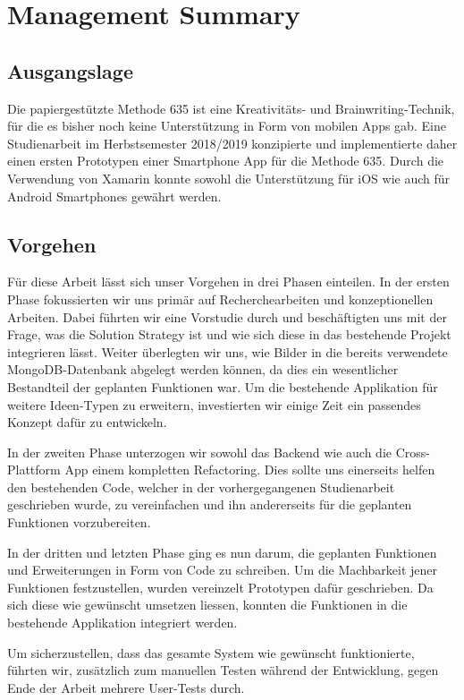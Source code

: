 \section{Management Summary}

\subsection{Ausgangslage}
Die papiergestützte Methode 635 ist eine Kreativitäts- und Brainwriting-Technik, für die es bisher noch keine Unterstützung in Form von mobilen Apps gab. Eine Studienarbeit im Herbstsemester 2018/2019 konzipierte und implementierte daher einen ersten Prototypen einer Smartphone App für die Methode 635. Durch die Verwendung von Xamarin konnte sowohl die Unterstützung für iOS wie auch für Android Smartphones gewährt werden.

\subsection{Vorgehen}
Für diese Arbeit lässt sich unser Vorgehen in drei Phasen einteilen. In der ersten Phase fokussierten wir uns primär auf Recherchearbeiten und konzeptionellen Arbeiten. Dabei führten wir eine Vorstudie durch und beschäftigten uns mit der Frage, was die Solution Strategy ist und wie sich diese in das bestehende Projekt integrieren lässt. Weiter überlegten wir uns, wie Bilder in die bereits verwendete MongoDB-Datenbank abgelegt werden können, da dies ein wesentlicher Bestandteil der geplanten Funktionen war. Um die bestehende Applikation für weitere Ideen-Typen zu erweitern, investierten wir einige Zeit ein passendes Konzept dafür zu entwickeln.

In der zweiten Phase unterzogen wir sowohl das Backend wie auch die Cross-Plattform App einem kompletten Refactoring. Dies sollte uns einerseits helfen den bestehenden Code, welcher in der vorhergegangenen Studienarbeit geschrieben wurde, zu vereinfachen und ihn andererseits für die geplanten Funktionen vorzubereiten.

In der dritten und letzten Phase ging es nun darum, die geplanten Funktionen und Erweiterungen in Form von Code zu schreiben. Um die Machbarkeit jener Funktionen festzustellen, wurden vereinzelt Prototypen dafür geschrieben. Da sich diese wie gewünscht umsetzen liessen, konnten die Funktionen in die bestehende Applikation integriert werden. 

Um sicherzustellen, dass das gesamte System wie gewünscht funktionierte, führten wir, zusätzlich zum manuellen Testen während der Entwicklung, gegen Ende der Arbeit mehrere User-Tests durch.

